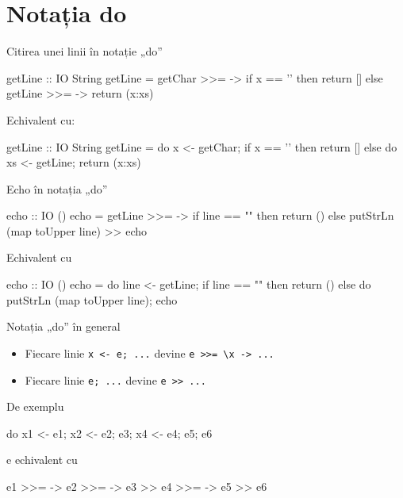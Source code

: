 \documentclass[xcolor=pdftex,romanian,colorlinks]{beamer}
\begin{document}
\section{Notația do}
\begin{frame}[fragile]{Citirea unei linii în notație „do”}
\vspace{-1ex}
\begin{asciihs}
   getLine :: IO String
   getLine = getChar >>= \x ->
              if x == '\n' then
                return []
              else
                getLine >>= \xs ->
                return (x:xs)
\end{asciihs}
\vspace{-1ex}
Echivalent cu:
\begin{asciihs}
   getLine :: IO String
   getLine = do {
                x <- getChar;
                if x == '\n' then
                  return []
                else do {
                  xs <- getLine;
                  return (x:xs)
                }
              }
\end{asciihs}

\end{frame}
%
%
\begin{frame}[fragile]{Echo în notația „do”}
\vspace{-1ex}
\begin{asciihs}
   echo :: IO ()
   echo = getLine >>= \line ->
           if line == "" then
             return ()
           else
             putStrLn (map toUpper line) >>
             echo

\end{asciihs}
\vspace{-1ex}
Echivalent cu
\begin{asciihs}
   echo :: IO ()
   echo = do {
             line <- getLine;
             if line == "" then
               return ()
             else do {
               putStrLn (map toUpper line);
               echo
             }
           }
\end{asciihs}
\end{frame}

\begin{frame}[fragile]{Notația „do” în general}
\begin{itemize}
\item Fiecare linie \lstinline$x <- e; ...$ devine \lstinline$e >>= \x -> ...$
\item Fiecare linie \lstinline$e; ...$ devine \lstinline$e >> ...$
\end{itemize}
De exemplu
\begin{asciihs}
   do { x1 <- e1;
        x2 <- e2;
        e3;
        x4 <- e4;
        e5;
        e6 }
\end{asciihs}
e echivalent cu
\begin{asciihs}
   e1   >>=  ->
   e2   >>=  ->
   e3   >>
   e4   >>=  ->
   e5   >>
   e6
\end{asciihs}
\end{frame}
\end{document}
